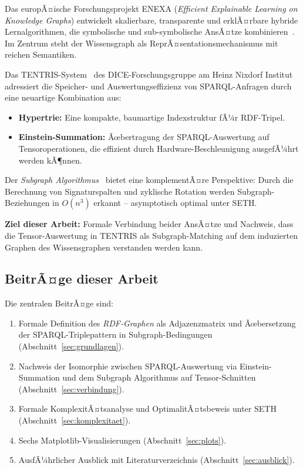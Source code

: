 ﻿\documentclass[a4paper,12pt]{article}
\theoremstyle{definition}
\begin{document}
Das europÃ¤ische Forschungsprojekt ENEXA (\emph{Efficient Explainable Learning on Knowledge
Graphs}) entwickelt skalierbare, transparente und erklÃ¤rbare hybride Lernalgorithmen, die
symbolische und sub-symbolische AnsÃ¤tze kombinieren~\cite{enexa2023}. Im Zentrum steht der
Wissensgraph als ReprÃ¤sentationsmechanismus mit reichen Semantiken.

Das TENTRIS-System~\cite{tentris2020} des DICE-Forschungsgruppe am Heinz Nixdorf Institut
adressiert die Speicher- und Auswertungseffizienz von SPARQL-Anfragen durch eine neuartige
Kombination aus:
\begin{itemize}
  \item \textbf{Hypertrie:} Eine kompakte, baumartige Indexstruktur fÃ¼r RDF-Tripel.
  \item \textbf{Einstein-Summation:} Ãœbertragung der SPARQL-Auswertung auf Tensoroperationen,
        die effizient durch Hardware-Beschleunigung ausgefÃ¼hrt werden kÃ¶nnen.
\end{itemize}

Der \emph{Subgraph Algorithmus}~\cite{epp2026subgraph} bietet eine komplementÃ¤re
Perspektive: Durch die Berechnung von Signaturspalten und zyklische Rotation werden
Subgraph-Beziehungen in $O(n^3)$ erkannt -- asymptotisch optimal unter SETH.

\textbf{Ziel dieser Arbeit:} Formale Verbindung beider AnsÃ¤tze und Nachweis, dass die
Tensor-Auswertung in TENTRIS als Subgraph-Matching auf dem induzierten Graphen des
Wissensgraphen verstanden werden kann.

\subsection{BeitrÃ¤ge dieser Arbeit}

Die zentralen BeitrÃ¤ge sind:
\begin{enumerate}
  \item Formale Definition des \emph{RDF-Graphen} als Adjazenzmatrix und Ãœbersetzung der
        SPARQL-Triplepattern in Subgraph-Bedingungen (Abschnitt~\ref{sec:grundlagen}).
  \item Nachweis der Isomorphie zwischen SPARQL-Auswertung via Einstein-Summation und dem
        Subgraph Algorithmus auf Tensor-Schnitten (Abschnitt~\ref{sec:verbindung}).
  \item Formale KomplexitÃ¤tsanalyse und OptimalitÃ¤tsbeweis unter SETH
        (Abschnitt~\ref{sec:komplexitaet}).
  \item Sechs Matplotlib-Visualisierungen (Abschnitt~\ref{sec:plots}).
  \item AusfÃ¼hrlicher Ausblick mit Literaturverzeichnis (Abschnitt~\ref{sec:ausblick}).
\end{enumerate}
\end{document}
